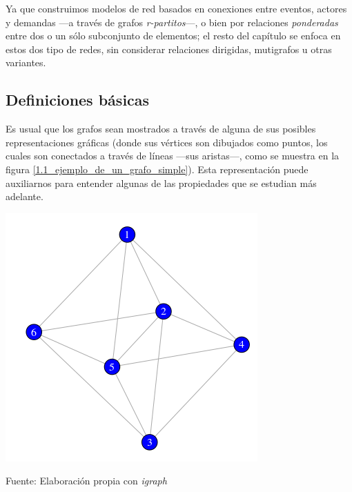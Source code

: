 \documentclass[letterpaper, 11pt]{book}
\theoremstyle{definition}
\theoremstyle{remark}
\begin{document}
Ya que construimos modelos de red basados en conexiones entre eventos, actores y demandas ---a través de grafos \emph{r-partitos}---, o bien por relaciones \emph{ponderadas} entre dos o un sólo subconjunto de elementos; el resto del capítulo se enfoca en estos dos tipo de redes, sin considerar relaciones dirigidas, mutigrafos u otras variantes. 




\subsection{Definiciones básicas}
\label{sec:DefinicionesBasicas}

Es usual que los grafos sean mostrados a través de alguna de sus posibles representaciones gráficas (donde sus vértices son dibujados como puntos, los cuales son conectados a través de líneas ---sus aristas---, como se muestra en la figura \ref{1.1_ejemplo_de_un_grafo_simple}). Esta representación puede auxiliarnos para entender algunas de las propiedades que se estudian más adelante.

\begin{minipage}{\linewidth}
\centering
{} \label{1.1_ejemplo_de_un_grafo_simple}
\includegraphics[scale=.4]{img/1.1_ejemplo_de_un_grafo_simple.png}
\par\bigskip
\small Fuente: Elaboración propia con \emph{igraph}
\end{minipage}\bigskip
\end{document}
